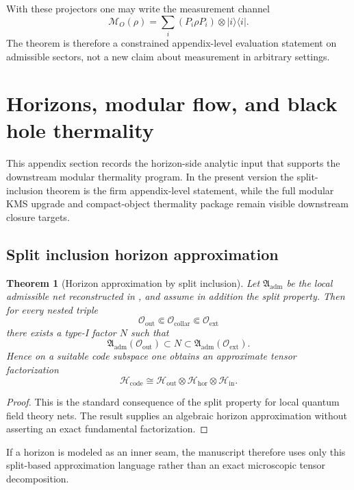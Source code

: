\documentclass[11pt,a4paper]{article}
\newtheorem{theorem}{Theorem}[section]
\theoremstyle{definition}
\theoremstyle{remark}
\begin{document}
With these projectors one may write the measurement channel
\[
\mathcal M_O(\rho)=\sum_i(P_i\rho P_i)\otimes |i\rangle\langle i|.
\]
The theorem is therefore a constrained appendix-level evaluation statement on admissible sectors,
not a new claim about measurement in arbitrary settings.

\section{Horizons, modular flow, and black hole thermality}
\label{app:horizons}

This appendix section records the horizon-side analytic input that supports the downstream modular
thermality program. In the present version the split-inclusion theorem is the firm appendix-level
statement, while the full modular KMS upgrade and compact-object thermality package remain visible
downstream closure targets.

\subsection{Split inclusion horizon approximation}

\begin{theorem}[Horizon approximation by split inclusion]
\label{thm:horizon-split-inclusion}
Let $\mathfrak A_{\mathrm{adm}}$ be the local admissible net reconstructed in
, and assume in addition the split property. Then for
every nested triple
\[
\mathcal O_{\mathrm{out}}\Subset \mathcal O_{\mathrm{collar}}\Subset \mathcal O_{\mathrm{ext}}
\]
there exists a type-I factor $N$ such that
\[
\mathfrak A_{\mathrm{adm}}(\mathcal O_{\mathrm{out}})
\subset
N
\subset
\mathfrak A_{\mathrm{adm}}(\mathcal O_{\mathrm{ext}}).
\]
Hence on a suitable code subspace one obtains an approximate tensor factorization
\[
\mathcal H_{\mathrm{code}}
\cong
\mathcal H_{\mathrm{out}}\otimes\mathcal H_{\mathrm{hor}}\otimes\mathcal H_{\mathrm{in}}.
\]
\end{theorem}

\begin{proof}
This is the standard consequence of the split property for local quantum field theory nets. The
result supplies an algebraic horizon approximation without asserting an exact fundamental
factorization.
\end{proof}

If a horizon is modeled as an inner seam, the manuscript therefore uses only this split-based
approximation language rather than an exact microscopic tensor decomposition.
\end{document}
